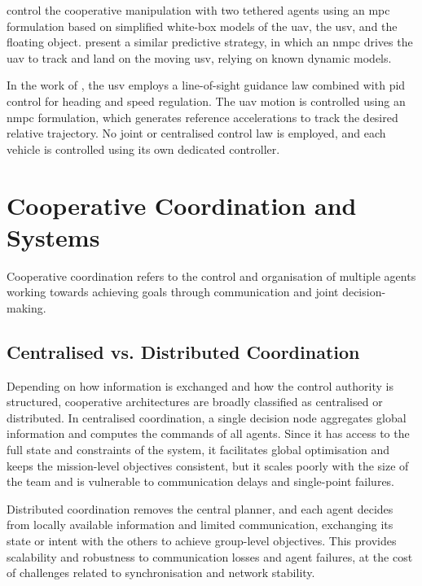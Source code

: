 \citet{novakCollaborativeObjectManipulation2024} control the cooperative manipulation with two tethered agents using an \gls{mpc} formulation based on simplified white-box models of the \gls{uav}, the \gls{usv}, and the floating object. \citet{liNMPCbasedUAVUSVCooperative2023} present a similar predictive strategy, in which an \gls{nmpc} drives the \gls{uav} to track and land on the moving \gls{usv}, relying on known dynamic models.

In the work of \citet{zhangCooperativeControlFramework2025}, the \gls{usv} employs a line-of-sight guidance law combined with \gls{pid} control for heading and speed regulation. The \gls{uav} motion is controlled using an \gls{nmpc} formulation, which generates reference accelerations to track the desired relative trajectory. No joint or centralised control law is employed, and each vehicle is controlled using its own dedicated controller.

\section{Cooperative Coordination and Systems}
\label{sec:sota_cooperation}

Cooperative coordination refers to the control and organisation of multiple agents working towards achieving goals through communication and joint decision-making.

\subsection{Centralised vs. Distributed Coordination}
\label{subsec:sota_coord_architectures}
Depending on how information is exchanged and how the control authority is structured, cooperative architectures are broadly classified as centralised or distributed. In centralised coordination, a single decision node aggregates global information and computes the commands of all agents. Since it has access to the full state and constraints of the system, it facilitates global optimisation and keeps the mission-level objectives consistent, but it scales poorly with the size of the team and is vulnerable to communication delays and single-point failures.

Distributed coordination removes the central planner, and each agent decides from locally available information and limited communication, exchanging its state or intent with the others to achieve group-level objectives. This provides scalability and robustness to communication losses and agent failures, at the cost of challenges related to synchronisation and network stability.

